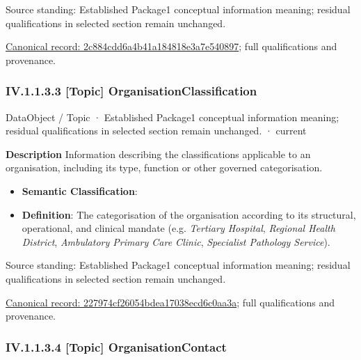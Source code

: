 Source standing: Established Package1 conceptual information meaning; residual qualifications in selected section remain unchanged.


{\footnotesize \href{../../../../../../../../continuum/application/data-object/topic/2c884cdd6a4b41a184818e3a7e540897.md}{Canonical record: 2c884cdd6a4b41a184818e3a7e540897}; full qualifications and provenance.}\par
\subsubsection*{IV.1.1.3.3 [Topic] OrganisationClassification}
\label{navigation:IV.1.1.3.3}

\label{element:227974cf26054bdea17038ecd6c0aa3a}
{\small DataObject / Topic · Established Package1 conceptual information meaning; residual qualifications in selected section remain unchanged. · current}\par

\textbf{Description}
Information describing the classifications applicable to an organisation, including its type, function or other governed categorisation.



\begin{itemize}


\item \textbf{Semantic Classification}: \texttt{}

\item \textbf{Definition}: The categorisation of the organisation according to its structural, operational, and clinical mandate (e.g. \emph{Tertiary Hospital}, \emph{Regional Health District}, \emph{Ambulatory Primary Care Clinic}, \emph{Specialist Pathology Service}).

\end{itemize}


Source standing: Established Package1 conceptual information meaning; residual qualifications in selected section remain unchanged.


{\footnotesize \href{../../../../../../../../continuum/application/data-object/topic/227974cf26054bdea17038ecd6c0aa3a.md}{Canonical record: 227974cf26054bdea17038ecd6c0aa3a}; full qualifications and provenance.}\par
\subsubsection*{IV.1.1.3.4 [Topic] OrganisationContact}
\label{navigation:IV.1.1.3.4}

